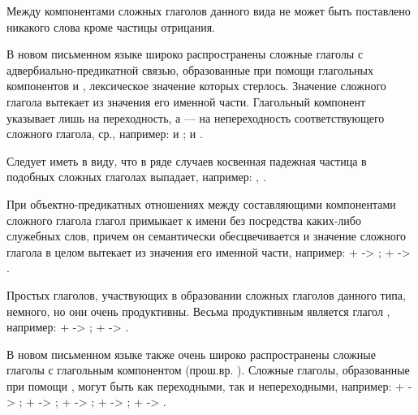 Между компонентами сложных глаголов данного вида не может быть поставлено никакого слова кроме частицы отрицания.

В новом письменном языке широко распространены сложные глаголы с адвербиально-предикатной связью, образованные при помощи глагольных компонентов  и , лексическое значение которых стерлось. Значение сложного глагола вытекает из значения его именной части. Глагольный компонент  указывает лишь на переходность, а  --- на непереходность соответствующего сложного глагола, ср., например:
 и ;
 и .

Следует иметь в виду, что в ряде случаев косвенная падежная частица в подобных сложных глаголах выпадает, например:
,
.

При объектно-предикатных отношениях между составляющими компонентами сложного глагола глагол примыкает к имени без посредства каких-либо служебных слов, причем он семантически обесцвечивается и значение сложного глагола в целом вытекает из значения его именной части, например:
 +  -> ;
 +  -> .

Простых глаголов, участвующих в образовании сложных глаголов данного типа, немного, но они очень продуктивны. Весьма продуктивным является глагол , например:
 +  -> ;
 +  -> .

В новом письменном языке также очень широко распространены сложные глаголы с глагольным компонентом  (прош.вр. ). Сложные глаголы, образованные при помощи , могут быть как переходными, так и непереходными, например:
 +  -> ;
 +  -> ;
 +  -> ;
 +  -> ;
 +  -> .

